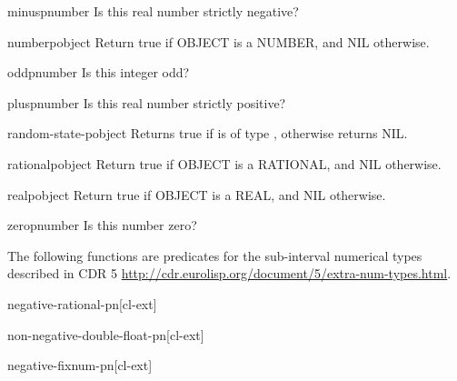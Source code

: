 \documentclass[10pt,english]{book}
\begin{document}
\begin{function}{minusp}{number}
  Is this real number strictly negative?
\end{function}

\begin{function}{numberp}{object}
  Return true if OBJECT is a NUMBER, and NIL otherwise.
\end{function}

\begin{function}{oddp}{number}
  Is this integer odd?
\end{function}

\begin{function}{plusp}{number}
  Is this real number strictly positive?
\end{function}

\begin{function}{random-state-p}{object}
  Returns true if  is of type ,
  otherwise returns NIL.
\end{function}

\begin{function}{rationalp}{object}
  Return true if OBJECT is a RATIONAL, and NIL otherwise.
\end{function}

\begin{function}{realp}{object}
  Return true if OBJECT is a REAL, and NIL otherwise.
\end{function}

\begin{function}{zerop}{number}
  Is this number zero?
\end{function}

The following functions are predicates for the sub-interval numerical
types described in CDR 5
\url{http://cdr.eurolisp.org/document/5/extra-num-types.html}.

\begin{function}{negative-rational-p}{n}[cl-ext]
  
\end{function}

\begin{function}{non-negative-double-float-p}{n}[cl-ext]
  
\end{function}

\begin{function}{negative-fixnum-p}{n}[cl-ext]
  
\end{function}
\end{document}
